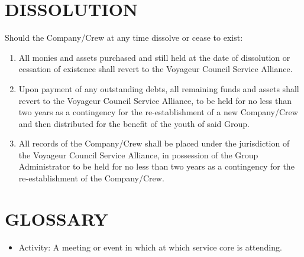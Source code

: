 \documentclass{Service_Corps_Document}
\begin{document}
\section{DISSOLUTION}
Should the Company/Crew at any time dissolve or cease to exist: 
\begin{enumerate}
	\item All monies and assets purchased and still held at the date of dissolution or cessation of existence shall revert to the Voyageur Council Service Alliance.
	\item Upon payment of any outstanding debts, all remaining funds and assets shall revert to the Voyageur Council Service Alliance, to be held for no less than two years as a contingency for the re-establishment of a new Company/Crew and then distributed for the benefit of the youth of said Group.
	\item All records of the Company/Crew shall be placed under the jurisdiction of the Voyageur Council Service Alliance, in possession of the Group Administrator to be held for no less than two years as a contingency for the re-establishment of the Company/Crew. 
\end{enumerate}
\section{GLOSSARY}
\begin{itemize}
	\item Activity: A meeting or event in which at which service core is attending.
\end{itemize}
\end{document}
